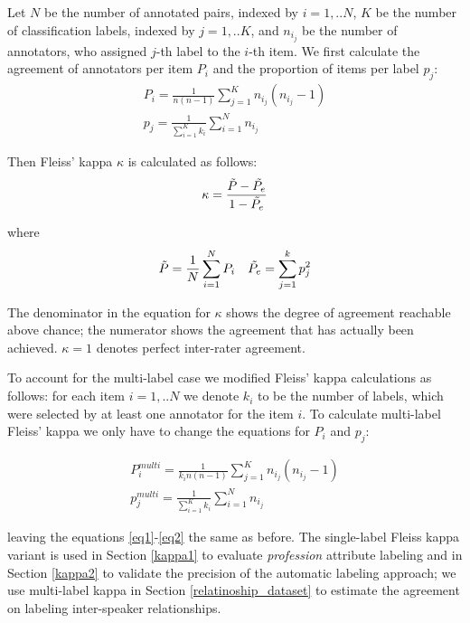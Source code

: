 Let $N$ be the number of annotated pairs, indexed by $i=1,..N$, $K$ be the number of classification labels, indexed by $j=1,..K$, and $n_i_j$ be the number of annotators, who assigned $j$-th label to the $i$-th item. We first calculate the agreement of annotators per item $P_i$ and the proportion of items per label $p_j$:
\begin{gather}
    P_i = \frac{1}{n (n-1)} \sum_{j=1}^K n_i_j(n_i_j - 1) \\  
    p_j = \frac{1}{\sum_{i=1}^K k_i} \sum_{i=1}^N n_i_j
\end{gather}

Then Fleiss' kappa $\kappa$ is calculated as follows:
\begin{align}
    \kappa = \frac{\Tilde{P} - \Tilde{P_e}}{1 - \Tilde{P_e}}
    \label{eq1}
\end{align}

where
\begin{align} \Tilde{P} = \frac{1}{N} \sum_{i=1}^N P_i &&
    \Tilde{P_e} = \sum_{j=1}^k p_j^2
    \label{eq2}
\end{align}

The denominator in the equation for $\kappa$ shows the degree of agreement reachable above chance; the numerator shows the agreement that has actually been achieved. $\kappa = 1$ denotes perfect inter-rater agreement.

To account for the multi-label case we modified Fleiss' kappa calculations as follows: for each item $i=1,..N$ we denote $k_i$ to be  the number of labels, which were selected by at least one annotator for the item $i$. To calculate multi-label Fleiss' kappa we only have to change the equations for $P_i$ and $p_j$:

\begin{gather}
    P^{multi}_i = \frac{1}{k_i n (n-1)} \sum_{j=1}^K n_i_j(n_i_j - 1) \\
    p^{multi}_j = \frac{1}{\sum_{i=1}^K k_i} \sum_{i=1}^N n_i_j
\end{gather}

leaving the equations \ref{eq1}-\ref{eq2} the same as before. The single-label Fleiss kappa variant is used in Section \ref{kappa1} to evaluate \textit{profession} attribute labeling and in Section \ref{kappa2} to validate the precision of the automatic labeling approach; we use multi-label kappa in Section \ref{relatinoship_dataset} to estimate the agreement on labeling inter-speaker relationships.